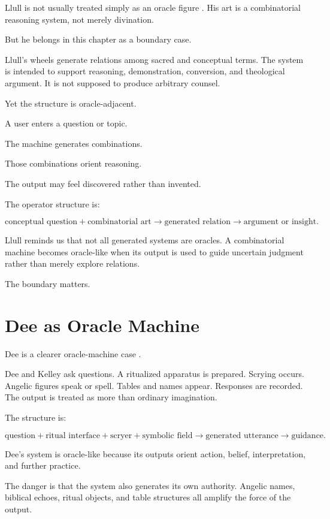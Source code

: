 \documentclass[11pt]{book}
\begin{document}
Llull is not usually treated simply as an oracle figure \cite{Yates1966ArtMemory,Yates1964GiordanoBruno,LlullBonner1985SelectedWorks}. His art is a combinatorial reasoning system, not merely divination.

But he belongs in this chapter as a boundary case.

Llull's wheels generate relations among sacred and conceptual terms. The system is intended to support reasoning, demonstration, conversion, and theological argument. It is not supposed to produce arbitrary counsel.

Yet the structure is oracle-adjacent.

A user enters a question or topic.

The machine generates combinations.

Those combinations orient reasoning.

The output may feel discovered rather than invented.

The operator structure is:

\[
\text{conceptual question}
+
\text{combinatorial art}
\rightarrow
\text{generated relation}
\rightarrow
\text{argument or insight}.
\]

Llull reminds us that not all generated systems are oracles. A combinatorial machine becomes oracle-like when its output is used to guide uncertain judgment rather than merely explore relations.

The boundary matters.

\section{Dee as Oracle Machine}

Dee is a clearer oracle-machine case \cite{DeeCasaubon1659TrueFaithfulRelation,Yates1964GiordanoBruno}.

Dee and Kelley ask questions. A ritualized apparatus is prepared. Scrying occurs. Angelic figures speak or spell. Tables and names appear. Responses are recorded. The output is treated as more than ordinary imagination.

The structure is:

\[
\text{question}
+
\text{ritual interface}
+
\text{scryer}
+
\text{symbolic field}
\rightarrow
\text{generated utterance}
\rightarrow
\text{guidance}.
\]

Dee's system is oracle-like because its outputs orient action, belief, interpretation, and further practice.

The danger is that the system also generates its own authority. Angelic names, biblical echoes, ritual objects, and table structures all amplify the force of the output.
\end{document}
